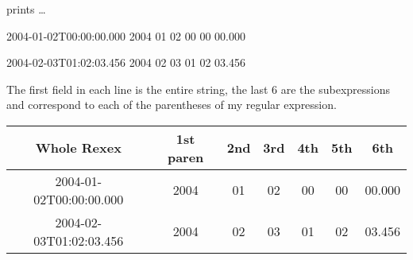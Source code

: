 prints \ldots

2004-01-02T00:00:00.000  2004  01  02 00 00 00.000

2004-02-03T01:02:03.456 2004 02 03 01 02 03.456

  The first field in each line is the entire string, the last 6 are
  the subexpressions and correspond to each of the parentheses of my
  regular expression.


\begin{center}
\begin{tabular}{||c|c|c|c|c|c|c||}\hline\hline
Whole Rexex             & 1st paren & 2nd & 3rd & 4th & 5th & 6th\\\hline\hline
2004-01-02T00:00:00.000 & 2004      & 01  & 02  & 00  & 00  & 00.000\\
2004-02-03T01:02:03.456 & 2004      & 02  & 03  & 01  & 02  & 03.456\\\hline
\end{tabular}
\end{center}



